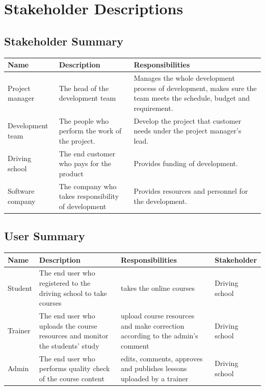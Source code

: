 \documentclass[a4paper]{article}
\begin{document}
\section{Stakeholder Descriptions}
\subsection{Stakeholder Summary}

\begin{table}[!htb]
\centering
\begin{tabular}{|p{4cm}|p{4cm}|p{5cm}|}
\hline
\rowcolor{gray}
Name & Description & Responsibilities \\ \hline
Project manager & The head of the development team & Manages the whole development process of development, makes sure the team meets the schedule, budget and requirement. \\ \hline
Development team & The people who perform the work of the project. & Develop the project that customer needs under the project manager’s lead. \\ \hline
Driving school & The end customer who pays for the product & Provides funding of development. \\ \hline
Software company & The company who takes responsibility of development & Provides resources and personnel for the development. \\
\hline

\end{tabular}
\end{table}

\subsection{User Summary}

\begin{table}[!htb]
\centering
\begin{tabular}{|p{2cm}|p{4cm}|p{4cm}|l|}
\hline
\rowcolor{gray}
Name & Description & Responsibilities & Stakeholder \\ \hline
Student & The end user who registered to the driving school to take courses & takes the online courses & Driving school \\ \hline
Trainer & The end user who uploads the course resources and monitor the students’ study & upload course resources and make correction according to the admin's comment& Driving school \\ \hline
Admin & The end user who performs quality check of the course content & edits, comments, approves and publishes  lessons uploaded by a trainer & Driving school \\ 
\hline

\end{tabular}
\end{table}
\end{document}
